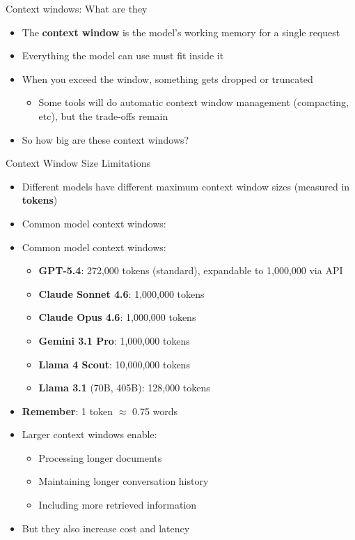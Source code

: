 \documentclass[aspectratio=169]{beamer}
\begin{document}
\begin{frame}{Context windows: What are they}
\begin{itemize}
    \item The \textbf{context window} is the model's working memory for a single request
    \item Everything the model can use must fit inside it
    \item When you exceed the window, something gets dropped or truncated
	\begin{itemize}
		\item Some tools will do automatic context window management (compacting, etc), but the trade-offs remain
	\end{itemize}
	\item So how big are these context windows?
\end{itemize}
\end{frame}

\begin{frame}{Context Window Size Limitations}
\begin{itemize}
    \item Different models have different maximum context window sizes (measured in \textbf{tokens})
    \item Common model context windows:
\item Common model context windows:
    \begin{itemize}
        \item \textbf{GPT-5.4}: 272,000 tokens (standard), expandable to 1,000,000 via API
        \item \textbf{Claude Sonnet 4.6}: 1,000,000 tokens
        \item \textbf{Claude Opus 4.6}: 1,000,000 tokens
        \item \textbf{Gemini 3.1 Pro}: 1,000,000 tokens
        \item \textbf{Llama 4 Scout}: 10,000,000 tokens
        \item \textbf{Llama 3.1} (70B, 405B): 128,000 tokens
    \end{itemize}
    \item \textbf{Remember}: 1 token $\approx$ 0.75 words
    \item Larger context windows enable:
    \begin{itemize}
        \item Processing longer documents
        \item Maintaining longer conversation history
        \item Including more retrieved information
    \end{itemize}
    \item But they also increase cost and latency
\end{itemize}
\end{frame}
\end{document}
